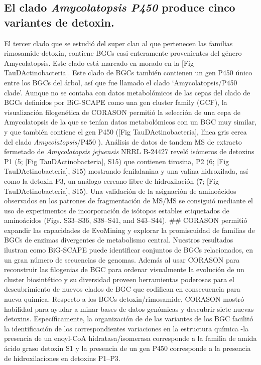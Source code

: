 \documentclass[12pt,twoside]{reedthesis}
\begin{document}
  \subsection{\texorpdfstring{El clado \emph{Amycolatopsis P450} produce
  cinco variantes de
  detoxin.}{El clado Amycolatopsis P450 produce cinco variantes de detoxin.}}\label{el-clado-amycolatopsis-p450-produce-cinco-variantes-de-detoxin.}
  
  El tercer clado que se estudió del super clan al que pertenecen las
  familias rimosamide-detoxin, contiene BGCs casi enteramente provenientes
  del género Amycolatopsis. Este clado está marcado en morado en la {[}Fig
  TauDActinobacteria{]}. Este clado de BGCs también contienen un gen P450
  único entre los BGCs del árbol, así que fue llamado el clado
  `Amycolatopsis/P450 clade'. Aunque no se contaba con datos metabolómicos
  de las cepas del clado de BGCs definidos por BiG-SCAPE como una gen
  cluster family (GCF), la visualización filogenética de CORASON permitió
  la selección de una cepa de Amycolatopsis de la que se tenían datos
  metabolómicos con un BGC muy similar, y que también contiene el gen P450
  ({[}Fig TauDActinobacteria{]}, línea gris cerca del clado
  \emph{Amycolatopsis}/P450 ). Análisis de datos de tandem MS de extracto
  fermetado de \emph{Amycolatopsis jejuensis} NRRL B-24427 reveló isómeros
  de detoxins P1 (5; {[}Fig TauDActinobacteria{]}, S15) que contienen
  tirosina, P2 (6; {[}Fig TauDActinobacteria{]}, S15) mostrando
  fenilalanina y una valina hidroxilada, así como la detoxin P3, un
  análogo cercano libre de hidroxilación (7; {[}Fig TauDActinobacteria{]},
  S15). Una validación de la asignación de aminoácidos observados en los
  patrones de fragmentación de MS/MS se consiguió mediante el uso de
  experimentos de incorporación de isótopos estables etiquetados de
  aminoácidos (Figs. S33--S36, S38--S41, and S43--S44). \#\# CORASON
  permitió expandir las capacidades de EvoMining y explorar la
  promiscuidad de familias de BGCs de enzimas divergentes de metabolismo
  central. Nuestros resultados ilustran como BiG-SCAPE puede identificar
  conjuntos de BGCs relacionados, en un gran número de secuencias de
  genomas. Además al usar CORASON para reconstruir las filogenias de BGC
  para ordenar visualmente la evolución de un cluster biosintético y su
  diversidad proveen herramientas poderosas para el descubrimiento de
  nuevos clados de BGC que codifican en consecuencia para nueva quimica.
  Respecto a los BGCs detoxin/rimosamide, CORASON mostró habilidad para
  ayudar a minar bases de datos genómicas y descubrir siete nuevas
  detoxins. Específicamente, la organización de de las variantes de los
  BGC facilitó la identificación de los correspondientes variaciones en la
  estructura química -la presencia de un enoyl-CoA hidratasa/isomerasa
  corresponde a la familia de amida ácido graso detoxin S1 y la presencia
  de un gen P450 corresponde a la presencia de hidroxilaciones en detoxins
  P1--P3.
  
\end{document}
